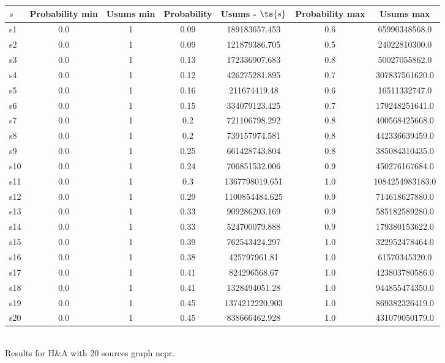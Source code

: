 \documentclass{article}
\begin{document}
\noindent\begin{tabular}{|l|c|c|c|c|c|c|}
\hline
$s$& Probability min & Usums min & Probability & Usums - $\ts{s}$ & Probability max & Usums max\\
\hline
s1 &0.0 & 1 & 0.09 & 189183657.453 & 0.6 & 65990348568.0\\
\hline
s2 &0.0 & 1 & 0.09 & 121879386.705 & 0.5 & 24022810300.0\\
\hline
s3 &0.0 & 1 & 0.13 & 172336907.683 & 0.8 & 50027055862.0\\
\hline
s4 &0.0 & 1 & 0.12 & 426275281.895 & 0.7 & 307837561620.0\\
\hline
s5 &0.0 & 1 & 0.16 & 211674419.48 & 0.6 & 16511332747.0\\
\hline
s6 &0.0 & 1 & 0.15 & 334079123.425 & 0.7 & 179248251641.0\\
\hline
s7 &0.0 & 1 & 0.2 & 721106798.292 & 0.8 & 400568425668.0\\
\hline
s8 &0.0 & 1 & 0.2 & 739157974.581 & 0.8 & 442336639459.0\\
\hline
s9 &0.0 & 1 & 0.25 & 661428743.804 & 0.8 & 385084310435.0\\
\hline
s10 &0.0 & 1 & 0.24 & 706851532.006 & 0.9 & 450276167684.0\\
\hline
s11 &0.0 & 1 & 0.3 & 1367798019.651 & 1.0 & 1084254983183.0\\
\hline
s12 &0.0 & 1 & 0.29 & 1100854484.625 & 0.9 & 714618627880.0\\
\hline
s13 &0.0 & 1 & 0.33 & 909286203.169 & 0.9 & 585182589280.0\\
\hline
s14 &0.0 & 1 & 0.33 & 524700079.888 & 0.9 & 179380153622.0\\
\hline
s15 &0.0 & 1 & 0.39 & 762543424.297 & 1.0 & 322952478464.0\\
\hline
s16 &0.0 & 1 & 0.38 & 425797961.81 & 1.0 & 61570345320.0\\
\hline
s17 &0.0 & 1 & 0.41 & 824296568.67 & 1.0 & 423803780586.0\\
\hline
s18 &0.0 & 1 & 0.41 & 1328494051.28 & 1.0 & 944855474350.0\\
\hline
s19 &0.0 & 1 & 0.45 & 1374212220.903 & 1.0 & 869382326419.0\\
\hline
s20 &0.0 & 1 & 0.45 & 838666462.928 & 1.0 & 431079050179.0\\
\hline
\end{tabular}\\

\noindent Results for H\&A with 20 sources graph ncpr.
\end{document}
